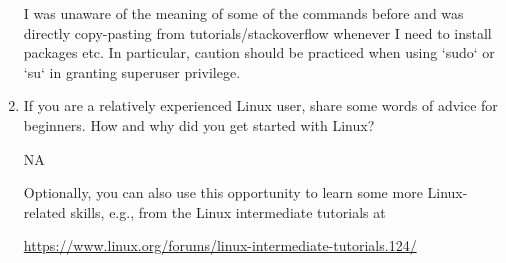 \documentclass[12pt]{article}
\begin{document}
\begin{enumerate}
I was unaware of the meaning of some of the commands before and was directly copy-pasting from tutorials/stackoverflow whenever I need to install packages etc. In particular, caution should be practiced when using `sudo` or `su` in granting superuser privilege. 


\item If you are a relatively experienced Linux user, share some words of advice for beginners. How and why did you get started with Linux?  

NA

Optionally, you can also use this opportunity to learn some more Linux-related skills, e.g., from the Linux intermediate tutorials at

\url{https://www.linux.org/forums/linux-intermediate-tutorials.124/}


\end{enumerate}
\end{document}
